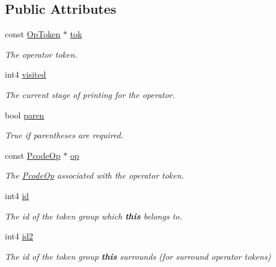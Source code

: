\subsection*{Public Attributes}
\begin{DoxyCompactItemize}
\item 
const \mbox{\hyperlink{class_op_token}{Op\+Token}} $\ast$ \mbox{\hyperlink{struct_print_language_1_1_reverse_polish_ac5309173a151a146eddc996c017b625a}{tok}}
\begin{DoxyCompactList}\small\item\em The operator token. \end{DoxyCompactList}\item 
int4 \mbox{\hyperlink{struct_print_language_1_1_reverse_polish_a9ba342eb7c3234b2e9449cd7349505ce}{visited}}
\begin{DoxyCompactList}\small\item\em The current stage of printing for the operator. \end{DoxyCompactList}\item 
bool \mbox{\hyperlink{struct_print_language_1_1_reverse_polish_abd7925ec148007f6794ae53bd862c448}{paren}}
\begin{DoxyCompactList}\small\item\em True if parentheses are required. \end{DoxyCompactList}\item 
const \mbox{\hyperlink{class_pcode_op}{Pcode\+Op}} $\ast$ \mbox{\hyperlink{struct_print_language_1_1_reverse_polish_a0b591df65fea01d8bbf975ca190e07d5}{op}}
\begin{DoxyCompactList}\small\item\em The \mbox{\hyperlink{class_pcode_op}{Pcode\+Op}} associated with the operator token. \end{DoxyCompactList}\item 
int4 \mbox{\hyperlink{struct_print_language_1_1_reverse_polish_aeba0caecbdfe9a1a3ea20217c74b5820}{id}}
\begin{DoxyCompactList}\small\item\em The id of the token group which {\bfseries{this}} belongs to. \end{DoxyCompactList}\item 
int4 \mbox{\hyperlink{struct_print_language_1_1_reverse_polish_afcd819d295e7895a687dbeb3d7c6473c}{id2}}
\begin{DoxyCompactList}\small\item\em The id of the token group {\bfseries{this}} surrounds (for surround operator tokens) \end{DoxyCompactList}\end{DoxyCompactItemize}



